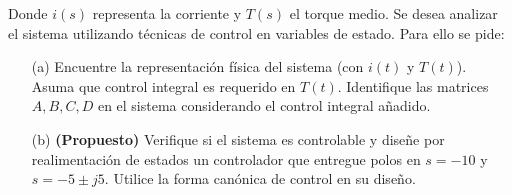 \documentclass[
  11pt,
  letterpaper,
   addpoints,
   answers
  ]{exam}
\begin{document}
\begin{questions}
\begin{center}
    \end{center}
    Donde \( i(s) \) representa la corriente y \( T(s) \) el torque medio. Se desea analizar el sistema utilizando técnicas de control en variables de estado. Para ello se pide:
    
    \begin{enumerate}
        \item[(a)] Encuentre la representación física del sistema (con \( i(t) \) y \( T(t) \)). Asuma que control integral es requerido en \( T(t) \). Identifique las matrices \( A, B, C, D \) en el sistema considerando el control integral añadido.
        
        \item[(b) \textbf{(Propuesto)}] Verifique si el sistema es controlable y diseñe por realimentación de estados un controlador que entregue polos en \( s = -10 \) y \( s = -5 \pm j5 \). Utilice la forma canónica de control en su diseño.
    \end{enumerate}
\begin{solution}

\end{solution}
\end{questions}
\end{document}
